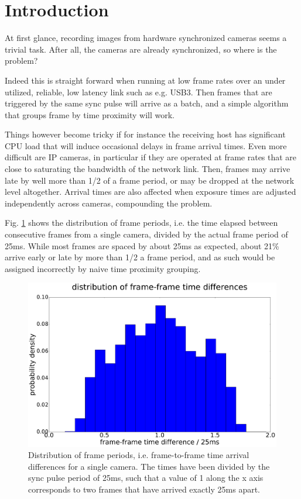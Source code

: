 \section{Introduction}
At first glance, recording images from hardware synchronized cameras seems a
trivial task. After all, the cameras are already synchronized, so
where is the problem?

Indeed this is straight forward when running at low frame rates over
an under utilized, reliable, low latency link such as e.g. USB3. Then
frames that are triggered by the same sync pulse will arrive as a
batch, and a simple algorithm that groups frame by time proximity will work.

Things however become tricky if for instance the receiving host has
significant CPU load that will induce occasional delays in frame arrival
times. Even more difficult are IP cameras, in particular if they are
operated at frame rates that are close to saturating the bandwidth of
the network link. Then, frames may arrive late by well more
than 1/2 of a frame period, or may be dropped at the network level
altogether. Arrival times are also affected when exposure times are
adjusted independently across cameras, compounding the problem.

Fig. \ref{fig:perioddist} shows the distribution of frame periods,
i.e. the time elapsed between consecutive frames from a single camera,
divided by the actual frame period of 25ms. While most frames are
spaced by about 25ms as expected, about 21\% arrive early or late by more than 1/2 a frame
period, and as such would be assigned incorrectly by naive time
proximity grouping.
\begin{figure}[h]
	\centering
	\includegraphics[width=\linewidth]{figures/period_dist.pdf}
        \caption{Distribution of frame periods, i.e. frame-to-frame time arrival
          differences for a single camera. The times have been divided
          by the sync pulse period of 25ms, such that a value of 1
          along the x axis corresponds to two frames that have arrived
          exactly  25ms apart.}
    \label{fig:perioddist}
\end{figure}

